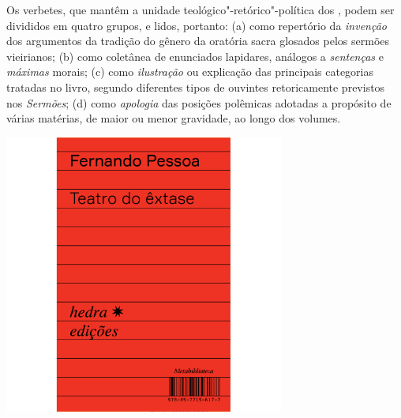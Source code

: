 Os verbetes, que mantêm a unidade
teológico"-retórico"-política dos {}, podem ser divididos em quatro
grupos, e lidos, portanto: (a) como repertório da \textit{invenção} dos argumentos da
tradição do gênero da oratória sacra glosados pelos sermões vieirianos; (b)
como coletânea de enunciados lapidares, análogos a \textit{sentenças} e
\textit{máximas} morais; (c) como \textit{ilustração} ou explicação das
principais categorias tratadas no livro, segundo diferentes tipos de ouvintes
retoricamente previstos nos \textit{Sermões}; (d) como \textit{apologia} das
posições polêmicas adotadas a propósito de várias matérias, de maior ou menor
gravidade, ao longo dos volumes.

\vfill

\hspace*{-.4cm}\begin{minipage}[c]{.5\linewidth}
\small{
{}}
\end{minipage}

\pagebreak

\hspace{.5cm}

\begin{center}
\hspace*{.5cm}\includegraphics[width=92mm]{./grid/pessoa.jpg}
\end{center}


